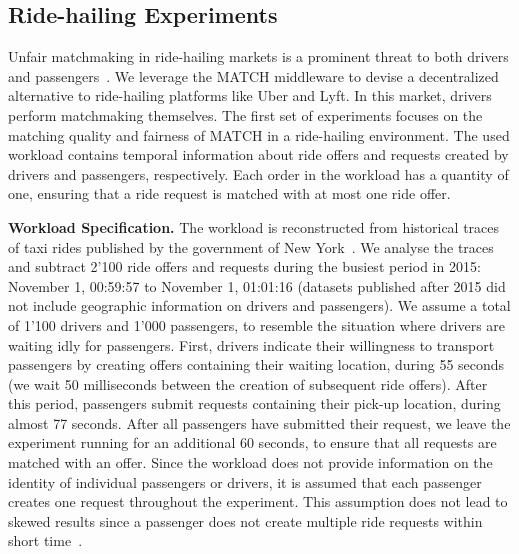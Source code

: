 \subsection{Ride-hailing Experiments}
\label{sec:taxi_experiments}
Unfair matchmaking in ride-hailing markets is a prominent threat to both drivers and passengers~\cite{bokanyi2019ride,calo2017taking}.
We leverage the MATCH middleware to devise a decentralized alternative to ride-hailing platforms like Uber and Lyft. %
In this market, drivers perform matchmaking themselves.
The first set of experiments focuses on the matching quality and fairness of MATCH in a ride-hailing environment.
The used workload contains temporal information about ride offers and requests created by drivers and passengers, respectively.
Each order in the workload has a quantity of one, ensuring that a ride request is matched with at most one ride offer.

\textbf{Workload Specification.}
The workload is reconstructed from historical traces of taxi rides published by the government of New York~\cite{tlc2017nyc}.
We analyse the traces and subtract 2'100 ride offers and requests during the busiest period in 2015: November 1, 00:59:57 to November 1, 01:01:16 (datasets published after 2015 did not include geographic information on drivers and passengers).
We assume a total of 1'100 drivers and 1'000 passengers, to resemble the situation where drivers are waiting idly for passengers.
First, drivers indicate their willingness to transport passengers by creating offers containing their waiting location, during 55 seconds (we wait 50 milliseconds between the creation of subsequent ride offers).
After this period, passengers submit requests containing their pick-up location, during almost 77 seconds.
After all passengers have submitted their request, we leave the experiment running for an additional 60 seconds, to ensure that all requests are matched with an offer.
Since the workload does not provide information on the identity of individual passengers or drivers, it is assumed that each passenger creates one request throughout the experiment. %
This assumption does not lead to skewed results since a passenger does not create multiple ride requests within short time~\cite{pham2017oride}.

